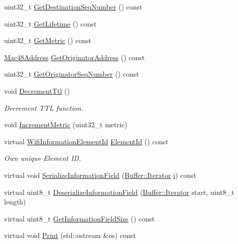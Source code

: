 \begin{DoxyCompactItemize}
\item 
uint32\+\_\+t \hyperlink{classns3_1_1dot11s_1_1IePrep_ae39da426eb2e976a7ac795aaa60d4989}{Get\+Destination\+Seq\+Number} () const 
\item 
uint32\+\_\+t \hyperlink{classns3_1_1dot11s_1_1IePrep_a84fb18686218ead38a85e362b87d4052}{Get\+Lifetime} () const 
\item 
uint32\+\_\+t \hyperlink{classns3_1_1dot11s_1_1IePrep_a1305834eb5a6310048e02f3d523f60b6}{Get\+Metric} () const 
\item 
\hyperlink{classns3_1_1Mac48Address}{Mac48\+Address} \hyperlink{classns3_1_1dot11s_1_1IePrep_afc6d05e3895f3be3e3c752ef70e6fd51}{Get\+Originator\+Address} () const 
\item 
uint32\+\_\+t \hyperlink{classns3_1_1dot11s_1_1IePrep_a6fdb8a41a4df65e270d7150e45c41d75}{Get\+Originator\+Seq\+Number} () const 
\item 
void \hyperlink{classns3_1_1dot11s_1_1IePrep_acd94d15b41e17c4f50c738d2756a0eaa}{Decrement\+Ttl} ()
\begin{DoxyCompactList}\small\item\em Decrement T\+TL function. \end{DoxyCompactList}\item 
void \hyperlink{classns3_1_1dot11s_1_1IePrep_a63feaf0b40553806d27ccf2f92b924b9}{Increment\+Metric} (uint32\+\_\+t metric)
\item 
virtual \hyperlink{namespacens3_aeb185e0c8a60816016bca079f1420478}{Wifi\+Information\+Element\+Id} \hyperlink{classns3_1_1dot11s_1_1IePrep_a5eea7e7f80f92256209a3baee9645d2a}{Element\+Id} () const 
\begin{DoxyCompactList}\small\item\em Own unique Element ID. \end{DoxyCompactList}\item 
virtual void \hyperlink{classns3_1_1dot11s_1_1IePrep_a69797a9a6526e0be57e1048aacaca364}{Serialize\+Information\+Field} (\hyperlink{classns3_1_1Buffer_1_1Iterator}{Buffer\+::\+Iterator} \hyperlink{lte__uplink__power__control_8m_a6f6ccfcf58b31cb6412107d9d5281426}{i}) const 
\item 
virtual uint8\+\_\+t \hyperlink{classns3_1_1dot11s_1_1IePrep_a08947daf4588697d23cb60c8fe7b765a}{Deserialize\+Information\+Field} (\hyperlink{classns3_1_1Buffer_1_1Iterator}{Buffer\+::\+Iterator} start, uint8\+\_\+t length)
\item 
virtual uint8\+\_\+t \hyperlink{classns3_1_1dot11s_1_1IePrep_aa1602d0de48f0829d58b43695910ff82}{Get\+Information\+Field\+Size} () const 
\item 
virtual void \hyperlink{classns3_1_1dot11s_1_1IePrep_a5b2a288377a0e23fd22000542f13b963}{Print} (std\+::ostream \&os) const 
\end{DoxyCompactItemize}
